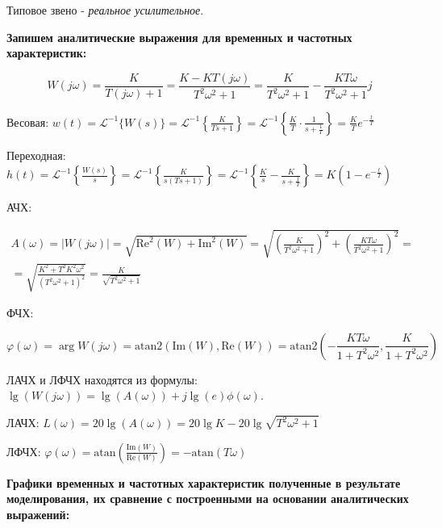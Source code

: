 Типовое звено - \textit{реальное усилительное}.

\textbf{Запишем аналитические выражения для временных и частотных характеристик:}

\begin{par}
$$W(j\omega )=\frac{K}{T(j\omega )+1}=\frac{K-KT(j\omega )}{T^2 \omega^2 +1}=\frac{K}{T^2 \omega^2 +1}-\frac{KT\omega }{T^2 \omega^2 +1}j$$
\end{par}

Весовая: $w(t)={\mathcal{L}}^{-1} \lbrace W(s)\rbrace ={\mathcal{L}}^{-1} \left\lbrace \frac{K}{Ts+1}\right\rbrace ={\mathcal{L}}^{-1} \left\lbrace \frac{K}{T}\cdot \frac{1}{s+\frac{1}{T}}\right\rbrace =\frac{K}{T}e^{-\frac{t}{T}}$

Переходная: $h(t)={\mathcal{L}}^{-1} \left\lbrace \frac{W(s)}{s}\right\rbrace ={\mathcal{L}}^{-1} \left\lbrace \frac{K}{s(Ts+1)}\right\rbrace ={\mathcal{L}}^{-1} \left\lbrace \frac{K}{s}-\frac{K}{s+\frac{1}{T}}\right\rbrace =K\left(1-e^{-\frac{t}{T}} \right)$

АЧХ: 

\begin{par}
$$\begin{array}{l}
A(\omega )=|W(j\omega )|=\sqrt{{\text{Re}}^2 (W)+{\text{Im}}^2 (W)}=\sqrt{{\left(\frac{K}{T^2 \omega^2 +1}\right)}^2 +{\left(\frac{KT\omega }{T^2 \omega^2 +1}\right)}^2 }=\\
=\sqrt{\frac{K^2 +T^2 K^2 \omega^2 }{(T^2 \omega^2 +1)^2 }}=\frac{K}{\sqrt{T^2 \omega^2 +1}}
\end{array}$$
\end{par}

ФЧХ:

\begin{par}
$$\varphi (\omega )=\arg W(j\omega )=\text{atan2}(\text{Im}(W),\text{Re}(W))=\text{atan2}\left(-\frac{KT\omega }{1+T^2 \omega^2 },\frac{K}{1+T^2 \omega^2 }\right)$$
\end{par}



ЛАЧХ и ЛФЧХ находятся из формулы: $\lg (W(j\omega ))=\lg (A(\omega ))+j\lg (e)\phi (\omega )$.

ЛАЧХ: $L(\omega )=20\lg \left(A(\omega )\right)=20\lg K-20\lg \sqrt{T^2 \omega^2 +1}$

ЛФЧХ: $\varphi (\omega )=\text{atan}\left(\frac{\text{Im}(W)}{\text{Re}(W)}\right)=-\text{atan}(T\omega )$

\textbf{Графики временных и частотных характеристик полученные в результате моделирования, их сравнение с построенными на основании аналитических выражений:}





